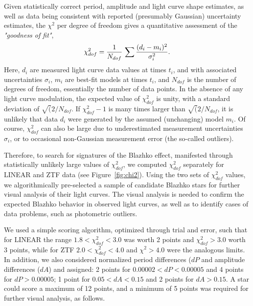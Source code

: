 Given statistically correct period, amplitude and light curve shape estimates,
as well as data being consistent with reported (presumably Gaussian) uncertainty estimates, the $\chi^2$ per degree
of freedom gives a quantitative assessment of the \textit{"goodness of fit"},
\begin{equation}
        \chi_{dof}^2 = {1 \over N_{dof}} \, \sum{\frac{(d_i - m_i)^2}{\sigma_i^2}}.
\end{equation}
Here, $d_i$ are measured light curve data values at times $t_i$, and with associated uncertainties $\sigma_i$,
$m_i$ are best-fit models at times $t_i$, and $N_{dof}$ is the number of degrees of freedom, essentially the
number of data points. In the absence of any light curve modulation, the expected value of $\chi^2_{dof}$ is
unity, with a standard deviation of $\sqrt(2/N_{dof}$.  If $\chi^2_{dof} - 1$ is many times  larger than 
$\sqrt(2/N_{dof}$, it is unlikely that data $d_i$ were generated by the assumed (unchanging) model $m_i$.  
Of course, $\chi^2_{dof}$ can also be large due to underestimated measurement uncertainties $\sigma_i$,
or to occasional non-Gaussian measurement error (the so-called outliers). 

Therefore, to search for signatures of the Blazhko effect, manifested through statistically unlikely large values
of $\chi^2_{dof}$, we computed $\chi^2_{dof}$ separately for LINEAR and ZTF data (see Figure~\ref{fig:chi2}). 
Using the two sets of $\chi^2_{dof}$ values, we algorithmically pre-selected a sample of candidate Blazhko stars
for further visual analysis of their light curves. The visual analysis is needed to confirm the expected Blazhko behavior
in observed light curves, as well as to identify cases of data problems, such as photometric outliers. 

We used a simple scoring algorithm, optimized through trial and error,
such that for LINEAR the range $1.8<\chi^2_{dof}<3.0$ was worth 2 points and $\chi^2_{dof}>3.0$ worth 3 points,
while for ZTF $2.0<\chi^2_{dof}<4.0$ and $\chi^2>4.0$ were the analogous limits. In addition, we also considered
normalized period differences ($dP$ and amplitude differences ($dA$) and assigned: 2 points for $0.00002 < dP < 0.00005$
and 4 points for $dP > 0.00005$; 1 point for $0.05 < dA < 0.15$ and 2 points for $dA > 0.15$. 
A star could score a maximum of 12 points, and a minimum of 5 points was required for further visual analysis, as follows.
 


